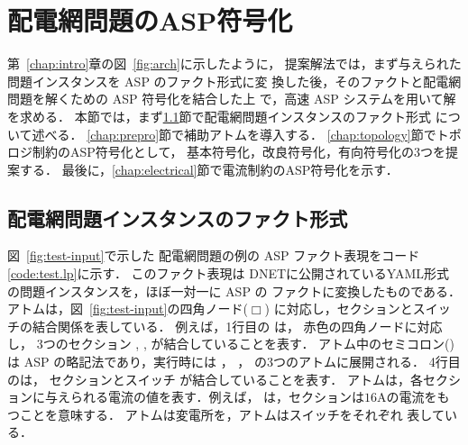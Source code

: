 ﻿\chapter{配電網問題のASP符号化}\label{chap:encode}

第~\ref{chap:intro}章の図~\ref{fig:arch}に示したように，
提案解法では，まず与えられた問題インスタンスを ASP のファクト形式に変
換した後，そのファクトと配電網問題を解くための ASP 符号化を結合した上
で，高速 ASP システム{\clingo}を用いて解を求める．
%
本節では，まず\ref{chap:fact}節で配電網問題インスタンスのファクト形式
について述べる．
\ref{chap:prepro}節で補助アトムを導入する．
\ref{chap:topology}節でトポロジ制約のASP符号化として，
基本符号化，改良符号化，有向符号化の3つを提案する．
最後に，\ref{chap:electrical}節で電流制約のASP符号化を示す．

\section{配電網問題インスタンスのファクト形式}\label{chap:fact}



図~\ref{fig:test-input}で示した
配電網問題の例の ASP ファクト表現をコード\ref{code:test.lp}に示す．
このファクト表現は
DNETに公開されているYAML形式の問題インスタンスを，ほぼ一対一に ASP の
ファクトに変換したものである．
%
アトムは，図~\ref{fig:test-input}の四角ノード($\Box$)
に対応し，セクションとスイッチの結合関係を表している．
例えば，1行目の
は，
赤色の四角ノードに対応し，
3つのセクション
, , 
が結合していることを表す．
アトム中のセミコロン(\code{;})は ASP の略記法であり，実行時には
，
，
の3つのアトムに展開される．
%
4行目のは，
セクションとスイッチ
が結合していることを表す．
%
アトムは，各セクションに与えられる電流の値を表す．例えば，
は，セクションは$16$Aの電流をもつことを意味する．
%
アトムは変電所を，アトムはスイッチをそれぞれ
表している．


